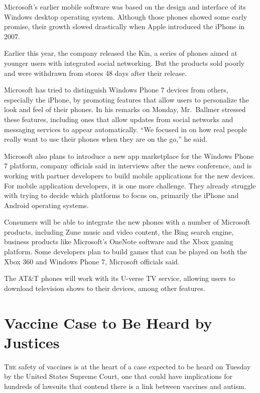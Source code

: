 ﻿\documentclass[12pt]{article}
\begin{document}
Microsoft's earlier mobile software was based on the design and interface of its Windows desktop
operating system. Although those phones showed some early promise, their growth slowed drastically
when Apple introduced the iPhone in 2007.

Earlier this year, the company released the Kin, a series of phones aimed at younger users with
integrated social networking. But the products sold poorly and were withdrawn from stores 48 days
after their release.

Microsoft has tried to distinguish Windows Phone 7 devices from others, especially the iPhone, by
promoting features that allow users to personalize the look and feel of their phones. In his remarks
on Monday, Mr.~Ballmer stressed these features, including ones that allow updates from social
networks and messaging services to appear automatically. ``We focused in on how real people really
want to use their phones when they are on the go,'' he said.

Microsoft also plans to introduce a new app marketplace for the Windows Phone 7 platform, company
officials said in interviews after the news conference, and is working with partner developers to
build mobile applications for the new devices. For mobile application developers, it is one more
challenge. They already struggle with trying to decide which platforms to focus on, primarily the
iPhone and Android operating systems.

Consumers will be able to integrate the new phones with a number of Microsoft products, including
Zune music and video content, the Bing search engine, business products like Microsoft's OneNote
software and the Xbox gaming platform. Some developers plan to build games that can be played on
both the Xbox 360 and Windows Phone 7, Microsoft officials said.

The AT\&T phones will work with its U-verse TV service, allowing users to download television shows
to their devices, among other features.

\section{Vaccine Case to Be Heard by Justices}

\lettrine{T}{he} safety of vaccines is at the heart of a case expected to be
heard on Tuesday by the United States Supreme Court, one that could have implications for hundreds
of lawsuits that contend there is a link between vaccines and autism.
\end{document}
